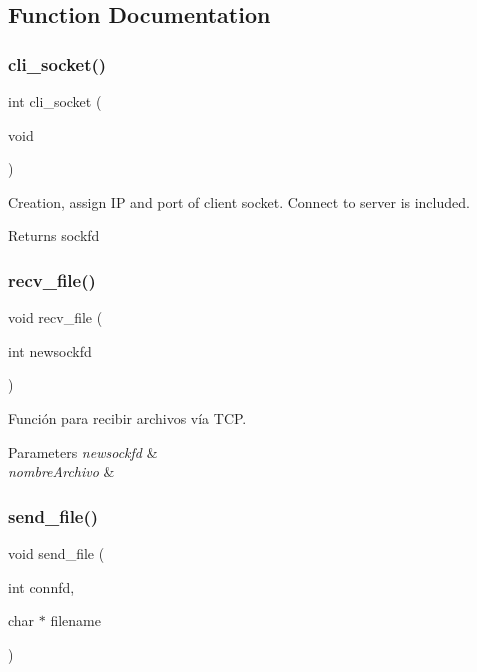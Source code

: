 \subsection{Function Documentation}
\mbox{\label{socket_8c_a9c129efbce40f3061d7899d2adf36a55}} 
\subsubsection{cli\+\_\+socket()}
{\footnotesize\ttfamily int cli\+\_\+socket (\begin{DoxyParamCaption}\item[{void}]{ }\end{DoxyParamCaption})}



Creation, assign IP and port of client socket. Connect to server is included. 

\begin{DoxyReturn}{Returns}
sockfd 
\end{DoxyReturn}
\mbox{\label{socket_8c_afe49ab8d5d6dbc407156f33dce0152cf}} 
\subsubsection{recv\+\_\+file()}
{\footnotesize\ttfamily void recv\+\_\+file (\begin{DoxyParamCaption}\item[{int}]{newsockfd }\end{DoxyParamCaption})}



Función para recibir archivos vía T\+CP. 


\begin{DoxyParams}{Parameters}
{\em newsockfd} & \\
\hline
{\em nombre\+Archivo} & \\
\hline
\end{DoxyParams}
\mbox{\label{socket_8c_a91bd21665371000f5251a149716f82fb}} 
\subsubsection{send\+\_\+file()}
{\footnotesize\ttfamily void send\+\_\+file (\begin{DoxyParamCaption}\item[{int}]{connfd,  }\item[{char $\ast$}]{filename }\end{DoxyParamCaption})}



